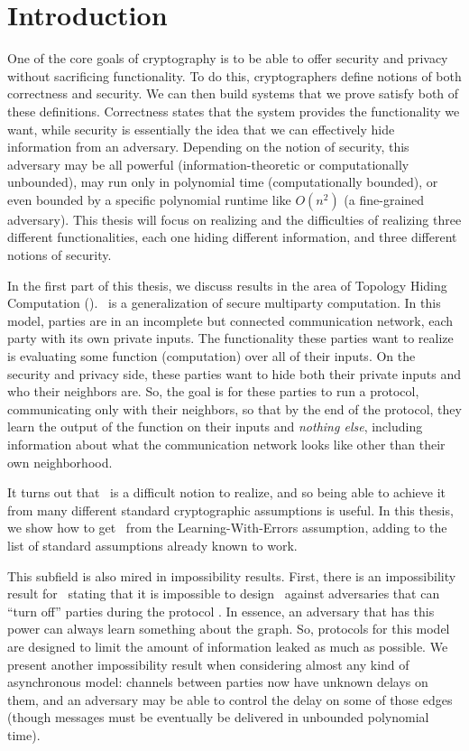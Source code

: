 
\chapter{Introduction}

One of the core goals of cryptography is to be able to offer security and privacy without sacrificing functionality.
To do this, cryptographers define notions of both correctness and security. We can then build systems that we prove satisfy both of these definitions. Correctness states that the system provides the functionality we want, while security is essentially the idea that we can effectively hide information from an adversary. Depending on the notion of security, this adversary may be all powerful (information-theoretic or computationally unbounded), may run only in polynomial time (computationally bounded), or even bounded by a specific polynomial runtime like $O(n^2)$ (a fine-grained adversary). This thesis will focus on realizing and the difficulties of realizing three different functionalities, each one hiding different information, and three different notions of security.

In the first part of this thesis, we discuss results in the area of Topology Hiding Computation (\THC). \THC~is a generalization of secure multiparty computation. In this model, parties are in an incomplete but connected communication network, each party with its own private inputs. The functionality these parties want to realize is evaluating some function (computation) over all of their inputs. On the security and privacy side, these parties want to hide both their private inputs and who their neighbors are.
So, the goal is for these parties to run a protocol, communicating only with their neighbors, so that by the end of the protocol, they learn the output of the function on their inputs and \emph{nothing else}, including information about what the communication network looks like other than their own neighborhood.

It turns out that \THC~is a difficult notion to realize, and so being able to achieve it from many different standard cryptographic assumptions is useful. In this thesis, we show how to get \THC~from the Learning-With-Errors assumption, adding to the list of standard assumptions already known to work.

This subfield is also mired in impossibility results.
First, there is an impossibility result for \THC~stating that it is impossible to design \THC~against adversaries that can ``turn off'' parties during the protocol \cite{MOR15}. In essence, an adversary that has this power can always learn something about the graph. So, protocols for this model are designed to limit the amount of information leaked as much as possible. We present another impossibility result when considering almost any kind of asynchronous model: channels between parties now have unknown delays on them, and an adversary may be able to control the delay on some of those edges (though messages must be eventually be delivered in unbounded polynomial time).

